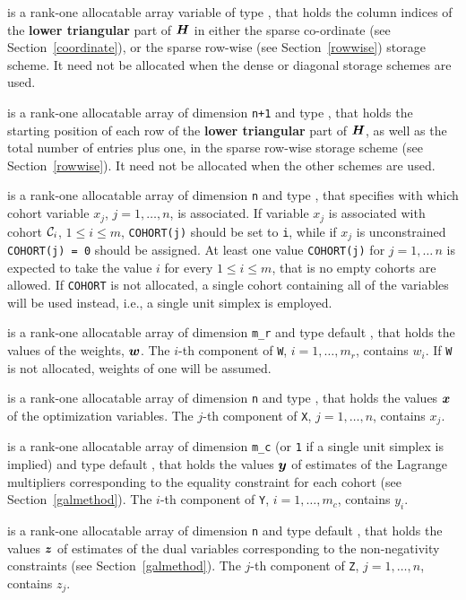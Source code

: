 \documentclass{galahad}
\begin{document}
\begin{description}
\begin{description}
 is a rank-one allocatable array variable of type \integer,
that holds the column indices of the {\bf lower triangular} part of
${\bm{H}}$ in either the sparse co-ordinate
(see Section~\ref{coordinate}), or the sparse row-wise
(see Section~\ref{rowwise}) storage scheme.
It need not be allocated when the dense or diagonal storage schemes are used.

 is a rank-one allocatable array of dimension {\tt n+1} and type
\integer, that holds the starting position of
each row of the {\bf lower triangular} part of ${\bm{H}}$, as well
as the total number of entries plus one, in the sparse row-wise storage
scheme (see Section~\ref{rowwise}). It need not be allocated when the
other schemes are used.

\end{description}

 is a rank-one allocatable array of dimension {\tt n} and type
\integer, that specifies with which cohort variable $x_j$, $j = 1,\ldots,n$, 
is associated. If variable $x_j$ is associated with cohort $\calC_i$, 
$1 \leq i \leq m$, {\tt COHORT(j)} should be set to {\tt i}, while if $x_j$ 
is unconstrained {\tt COHORT(j) = 0} should be assigned. At least one value 
{\tt COHORT(j)} for $j = 1,\ldots\,n$ is expected to take the value $i$ 
for every $1 \leq i \leq m$, that is no empty cohorts are allowed.
If {\tt COHORT} is not allocated, a single cohort containing all of
the variables will be used instead, i.e., a single unit simplex is employed.

 is a rank-one allocatable array of dimension {\tt m\_r} and 
type default \realdp, that holds the values of the weights, ${\bm{w}}$.
The $i$-th component of {\tt W}, $i = 1, \ldots , m_r$, contains $w_{i}$.
If {\tt W} is not allocated, weights of one will be assumed.

 is a rank-one allocatable array of dimension {\tt n} and type
\realdp, that holds the values ${\bm{x}}$ of the optimization variables.
The $j$-th component of {\tt X}, $j = 1, \ldots, n$, contains $x_{j}$.

 is a rank-one allocatable array of dimension {\tt m\_c} (or {\tt 1} if
a single unit simplex is implied) and type default \realdp, that holds
the values ${\bm{y}}$ of estimates of the Lagrange multipliers
corresponding to the equality constraint for each cohort 
(see Section~\ref{galmethod}).
The $i$-th component of {\tt Y}, $i = 1, \ldots, m_c$, contains $y_{i}$.

 is a rank-one allocatable array of dimension {\tt n} and type default
\realdp, that holds the values ${\bm{z}}$ of estimates  of the dual variables
corresponding to the non-negativity constraints (see Section~\ref{galmethod}).
The $j$-th component of {\tt Z}, $j = 1, \ldots, n$, contains $z_{j}$.


\end{description}
\end{document}
